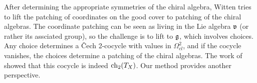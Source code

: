 After determining the appropriate symmetries of the chiral algebra, 
Witten tries to lift the patching of coordinates on the good cover to patching of the chiral algebras.
The coordinate patching can be seen as living in the Lie algebra $\frak{v}$ (or rather its assciated group),
so the challenge is to lift to $\mathfrak g$, which involves choices.
Any choice determines a \v{C}ech 2-cocycle with values in $\Omega^2_{cl}$,
and if the cocycle vanishes,
the choices determine a patching of the chiral algebras.
The work of \cite{GMS} showed that this cocycle is indeed ${\rm ch}_2(T_X)$.
Our method provides another perspective.

